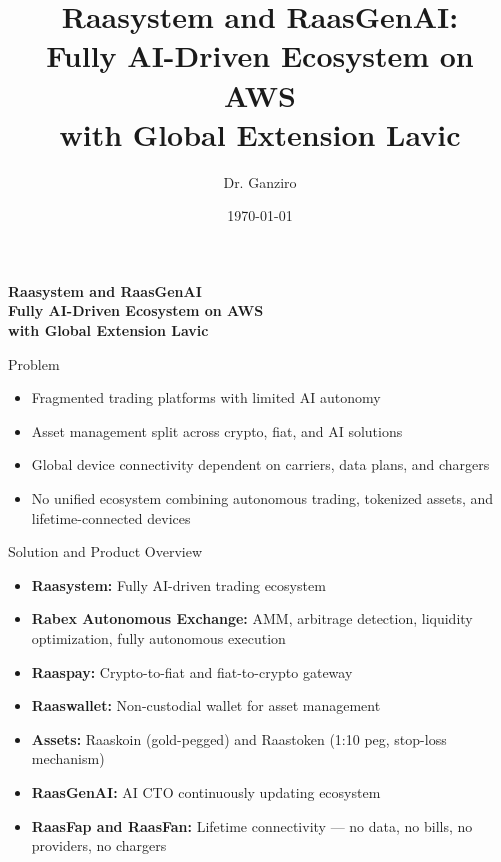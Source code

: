 \documentclass{beamer}
\title[RAASYSTEM \& LAVIC]{Raasystem and RaasGenAI:\\ Fully AI-Driven Ecosystem on AWS\\with Global Extension Lavic}
\author{Dr. Ganziro}
\date{\today}
\begin{document}
\begin{frame}[plain]
    \centering
    {\huge \color{raasblue} \textbf{Raasystem and RaasGenAI}\\[0.3cm]
    \textbf{Fully AI-Driven Ecosystem on AWS}\\[0.3cm]
    \textbf{with Global Extension Lavic}\par}
    \vspace{1cm}
    {\large \insertauthor\par}
    {\small \insertdate\par}
\end{frame}

\begin{frame}{Problem}
\begin{itemize}
    \item Fragmented trading platforms with limited AI autonomy
    \item Asset management split across crypto, fiat, and AI solutions
    \item Global device connectivity dependent on carriers, data plans, and chargers
    \item No unified ecosystem combining autonomous trading, tokenized assets, and lifetime-connected devices
\end{itemize}
\end{frame}

\begin{frame}{Solution and Product Overview}
\begin{itemize}
    \item \textbf{Raasystem:} Fully AI-driven trading ecosystem
    \item \textbf{Rabex Autonomous Exchange:} AMM, arbitrage detection, liquidity optimization, fully autonomous execution
    \item \textbf{Raaspay:} Crypto-to-fiat and fiat-to-crypto gateway
    \item \textbf{Raaswallet:} Non-custodial wallet for asset management
    \item \textbf{Assets:} Raaskoin (gold-pegged) and Raastoken (1:10 peg, stop-loss mechanism)
    \item \textbf{RaasGenAI:} AI CTO continuously updating ecosystem
    \item \textbf{RaasFap and RaasFan:} Lifetime connectivity — no data, no bills, no providers, no chargers
\end{itemize}
\end{frame}
\end{document}
